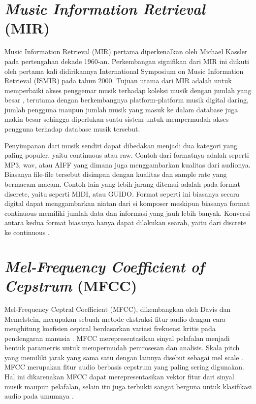 \section{\emph{Music Information Retrieval} (MIR)}
\label{sec:mir}

Music Information Retrieval (MIR) pertama diperkenalkan oleh Michael Kassler pada pertengahan dekade 1960-an. Perkembangan signifikan dari MIR ini diikuti oleh pertama kali didirikannya International Symposium on Music Information Retrieval (ISMIR) pada tahun 2000. Tujuan utama dari MIR adalah untuk memperbaiki akses penggemar musik terhadap koleksi musik dengan jumlah yang besar \citep{lefaivre2019characterizing}, terutama dengan berkembangnya platform-platform musik digital daring, jumlah pengguna maupun jumlah musik yang masuk ke dalam database juga makin besar sehingga diperlukan suatu sistem untuk mempermudah akses pengguna terhadap database musik tersebut. 

Penyimpanan dari musik sendiri dapat dibedakan menjadi dua kategori yang paling populer, yaitu continuous atau raw. Contoh dari formatnya adalah seperti MP3, wav, atau AIFF yang dimana juga menggambarkan kualitas dari audionya. Biasanya file-file tersebut disimpan dengan kualitas dan sample rate yang bermacam-macam. Contoh lain yang lebih jarang ditemui adalah pada format discrete, yaitu seperti MIDI, atau GUIDO. Format seperti ini biasanya secara digital dapat menggambarkan niatan dari si komposer meskipun biasanya format continuous memiliki jumlah data dan informasi yang jauh lebih banyak. Konversi antara kedua format biasanya hanya dapat dilakukan searah, yaitu dari discrete ke continuous \citep{McDermott2005TheSO}. 

\section{\emph{Mel-Frequency Coefficient of Cepstrum} (MFCC)}
\label{sec:mfcc}

Mel-Frequency Ceptral Coefficient (MFCC), dikembangkan oleh Davis dan Memelstein, merupakan sebuah metode ekstraksi fitur audio dengan cara menghitung koefisien ceptral berdasarkan variasi frekuensi kritis pada pendengaran manusia \citep{Widodo2017PenerapanMM}.
MFCC merepresentasikan sinyal pelafalan menjadi bentuk parametris untuk mempermudah pemrosesan dan analisis. Skala pitch yang memiliki jarak yang sama satu dengan lainnya disebut sebagai mel scale \citep{audiosignal1}.
MFCC merupakan fitur audio berbasis cepstrum yang paling sering digunakan. Hal ini dikarenakan MFCC dapat merepresentasikan vektor fitur dari sinyal musik maupun pelafalan, selain itu juga terbukti sangat berguna untuk klasifikasi audio pada umumnya \citep{li2019digital}.

